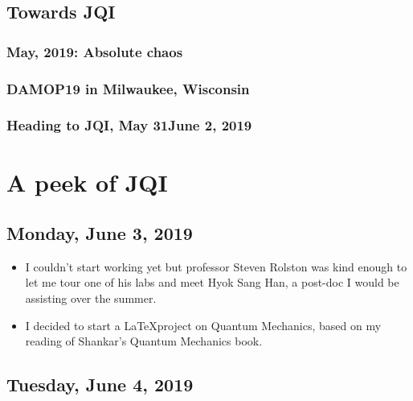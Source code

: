 \documentclass{book}
\theoremstyle{definition}
\begin{document}
\section*{Towards JQI}

\subsection*{May, 2019: Absolute chaos}

\subsection*{DAMOP19 in Milwaukee, Wisconsin}

\subsection*{Heading to JQI, May 31\textendash June 2, 2019}


\chapter{A peek of JQI}

\section*{Monday, June 3, 2019}

\begin{itemize}
	\item I couldn't start working yet but professor Steven Rolston was kind enough to let me tour one of his labs and meet Hyok Sang Han, a post-doc I would be assisting over the summer.  
	\item I decided to start a \LaTeX project on Quantum Mechanics, based on my reading of Shankar's Quantum Mechanics book. 
\end{itemize}








\section*{Tuesday, June 4, 2019}
\end{document}
